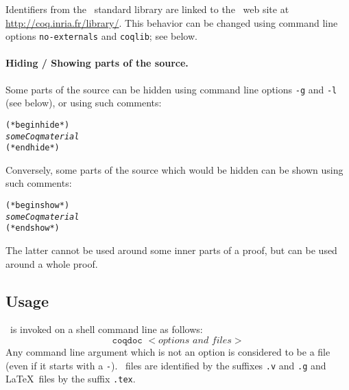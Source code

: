 Identifiers from the \Coq\ standard library are linked to the \Coq\
web site at \url{http://coq.inria.fr/library/}. This behavior can be
changed using command line options \texttt{\mm{}no-externals} and
\texttt{\mm{}coqlib}; see below.


\paragraph{Hiding / Showing parts of the source.}
Some parts of the source can be hidden using command line options
\texttt{-g} and \texttt{-l} (see below), or using such comments:
\begin{alltt}
(* begin hide *)
\emph{some Coq material}
(* end hide *)
\end{alltt}
Conversely, some parts of the source which would be hidden can be
shown using such comments:
\begin{alltt}
(* begin show *)
\emph{some Coq material}
(* end show *)
\end{alltt}
The latter cannot be used around some inner parts of a proof, but can
be used around a whole proof.



\subsection{Usage}

\coqdoc\ is invoked on a shell command line as follows:
\begin{displaymath}
  \texttt{coqdoc }<\textit{options and files}>
\end{displaymath}
Any command line argument which is not an option is considered to be a
file (even if it starts with a \verb!-!). \Coq\ files are identified
by the suffixes \verb!.v! and \verb!.g! and \LaTeX\ files by the
suffix \verb!.tex!.

